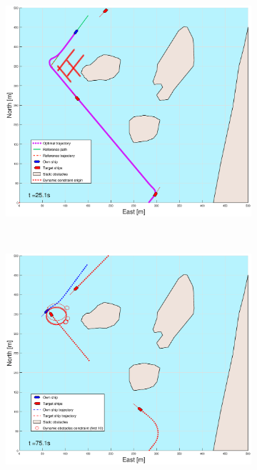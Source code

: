 \begin{figure}[!ht]
\begin{subfigure}[b]{0.49\textwidth}
    \end{subfigure}
    \hfill
    \begin{subfigure}[b]{0.499\textwidth}
        \centering
        \includegraphics[width=\textwidth]{Images/Figures/Helloya_Rev/_Simple_0fig999_time=25}
    \end{subfigure}
    \hfill
    \\
    \begin{subfigure}[b]{0.49\textwidth}
        \centering
        \includegraphics[width=\textwidth]{Images/Figures/Helloya_Rev/_Simple_0fig1_time=75}

\end{subfigure}
\end{figure}
